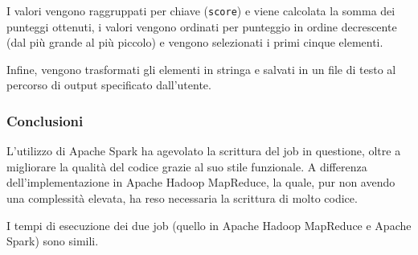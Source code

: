 \documentclass[10pt]{article}
\begin{document}
I valori vengono raggruppati per chiave (\texttt{score}) e viene calcolata la somma dei punteggi ottenuti, i valori vengono ordinati per punteggio in ordine decrescente (dal più grande al più piccolo) e vengono selezionati i primi cinque elementi.

Infine, vengono trasformati gli elementi in stringa e salvati in un file di testo al percorso di output specificato dall'utente.

\subsubsection{Conclusioni}

L'utilizzo di Apache Spark ha agevolato la scrittura del job in questione, oltre a migliorare la qualità del codice grazie al suo stile funzionale. A differenza dell'implementazione in Apache Hadoop MapReduce, la quale, pur non avendo una complessità elevata, ha reso necessaria la scrittura di molto codice.

I tempi di esecuzione dei due job (quello in Apache Hadoop MapReduce e Apache Spark) sono simili.

\begin{comment}

Please provide:
\begin{itemize}
\item Description of the implementation. A schematic and concise discussion is preferrable to a verbose narrative. Focus on how the data is manipulated in the job (e.g., what do keys and values represent across the different stages, what operations are carried out). 
\item Performance considerations with respect the (potentially) carried out optimizations, e.g., in terms of:
\begin{itemize}
\item allocated resources and tasks;
\item enforced partitioning;
\item data caching;
\item combiner usage;
\item broadcast variables usage;
\item any other kind of optimization.
\end{itemize}
\item Short extract of the output and discussion (i.e., whether there is any relevant insight obtained).
\end{itemize}

\end{comment}
\end{document}
